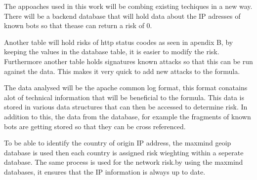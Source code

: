 The appoaches used in this work will be combing existing techiques in a new way. There will be a backend database that will hold data about the IP adresses of known bots so that thease can return a risk of 0. 

Another table will hold risks of http status coodes as  seen in apendix B, by keeping the values in the database table, it is easier to modify the risk. Furthermore another table holds signatures known attacks so that this can be run against the data. This makes it very quick to add new attacks to the formula.

The data analysed will be the apache common log format, this format conatains alot of technical information that will be beneficial to the formula. This data is stored in various data structures that can then be accessed to determine risk. In addition to this, the data from the database, for example the fragments of known bots are getting stored so that they can be cross referenced.  

To be able to identify the country of origin IP address, the maxmind geoip database is used then each country is assigned risk wieghting within a seperate database. The same process is used for the network risk.by using the maxmind databases, it ensures that the IP information is always up to date.